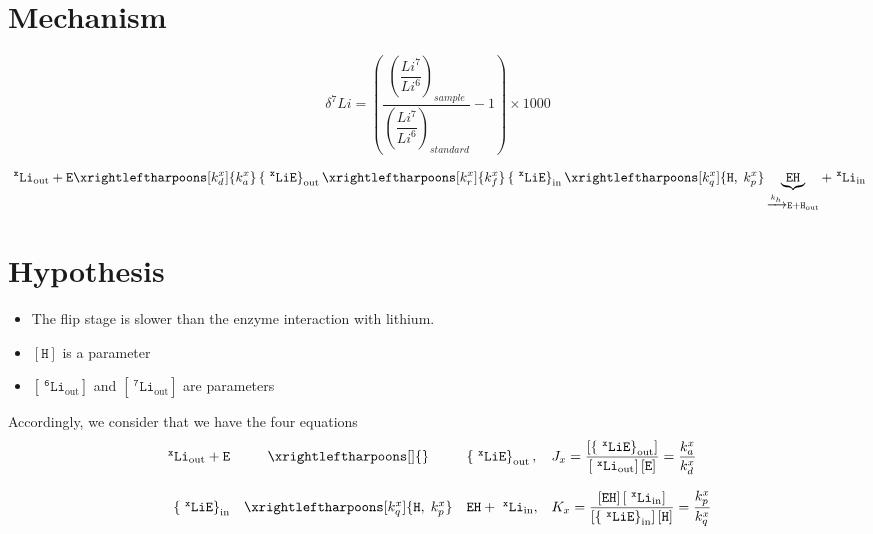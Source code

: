 \documentclass[aps,onecolumn,11pt]{revtex4}
\newcommand{\mychem}[1]{\mathtt{#1}}
\newcommand{\myconc}[1]{\left\lbrack{#1}\right\rbrack}
\newcommand{\spLi}[1]{{~^{\mychem{#1}}\mychem{Li}}}
\newcommand{\spEout}{\mychem{E}}
\newcommand{\Eout}{\myconc{\spEout}}
\newcommand{\spLiEin}[1]{\left\lbrace\spLi{#1}\spEout\right\rbrace_{\mathrm{in}}}
\newcommand{\LiEin}[1]{\myconc{\spLiEin{#1}}}
\newcommand{\spLiEout}[1]{\left\lbrace\spLi{#1}\spEout\right\rbrace_{\mathrm{out}}}
\newcommand{\LiEout}[1]{\myconc{\spLiEout{#1}}}
\newcommand{\spLiIn}[1]{{\spLi{#1}}_{\mathrm{in}}}
\newcommand{\LiIn}[1]{\myconc{\spLiIn{#1}}}
\newcommand{\spLiOut}[1]{{\spLi{#1}}_{\mathrm{out}}}
\newcommand{\LiOut}[1]{\myconc{\spLiOut{#1}}}
\newcommand{\spEHin}{\mychem{EH}}
\newcommand{\EHin}{\myconc{\spEHin}}
\newcommand{\spproton}{\mychem{H}}
\newcommand{\proton}{\myconc{\spproton}}
\begin{document}
\section{Mechanism}
$$
	\delta^7Li = \left(
		\dfrac{\left(\dfrac{Li^7}{Li^6}\right)_{sample}}
		{\left(\dfrac{Li^7}{Li^6}\right)_{standard}}
		 -1 
	\right) \times 1000
$$


\begin{equation}
	 \spLiOut{x} +  \spEout  
	 \xrightleftharpoons[k_d^x]{k_a^x} 
	 \spLiEout{x}
	  \xrightleftharpoons[k_r^x]{k_f^x} 
	  \spLiEin{x} 
	  \xrightleftharpoons[k_q^x]{\mychem{H},\;k_p^x} \underbrace{\spEHin}_{\xrightarrow[]{k_h} \mychem{E} + \mychem{H}_{\mathrm{out}}} + \spLiIn{x}
\end{equation}

\section{Hypothesis}
\begin{itemize}
\item The flip stage is slower than the enzyme interaction with lithium.
\item $\proton$ is a parameter
\item $\LiOut{6}$ and  $\LiOut{7}$ are parameters
\end{itemize}

Accordingly, we consider that we have the four equations
\begin{equation}
	\begin{array}{rcll}
	 \spLiOut{x} +  \spEout &  \xrightleftharpoons[]{} & \spLiEout{x}, & J_x = \dfrac{\LiEout{x}}{\LiOut{x} \Eout} = \dfrac{k_a^x}{k_d^x}\\
	 \\
	 \spLiEin{x} & \xrightleftharpoons[k_q^x]{\mychem{H},\;k_p^x} & {\spEHin}+ \spLiIn{x}, &K_x = \dfrac{\EHin \LiIn{x}}{\LiEin{x}\proton} = \dfrac{k_p^x}{k_q^x} \\
	\end{array}
\end{equation}
\end{document}

